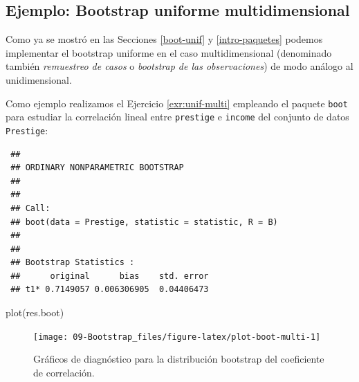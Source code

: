 \documentclass[
]{book}
\newenvironment{Shaded}{\begin{snugshade}}{\end{snugshade}}
\newcommand{\AttributeTok}[1]{\textcolor[rgb]{0.77,0.63,0.00}{#1}}
\newcommand{\ControlFlowTok}[1]{\textcolor[rgb]{0.13,0.29,0.53}{\textbf{#1}}}
\newcommand{\DecValTok}[1]{\textcolor[rgb]{0.00,0.00,0.81}{#1}}
\newcommand{\FunctionTok}[1]{\textcolor[rgb]{0.00,0.00,0.00}{#1}}
\newcommand{\NormalTok}[1]{#1}
\newcommand{\OtherTok}[1]{\textcolor[rgb]{0.56,0.35,0.01}{#1}}
\newcommand{\SpecialCharTok}[1]{\textcolor[rgb]{0.00,0.00,0.00}{#1}}
\theoremstyle{break}
\theoremstyle{nonumberplain}
\begin{document}
\hypertarget{boot-unif-multi}{%
\subsection{Ejemplo: Bootstrap uniforme multidimensional}\label{boot-unif-multi}}

Como ya se mostró en las Secciones \ref{boot-unif} y \ref{intro-paquetes} podemos implementar el bootstrap uniforme en el caso multidimensional (denominado también \emph{remuestreo de casos} o \emph{bootstrap de las observaciones}) de modo análogo al unidimensional.

Como ejemplo realizamos el Ejercicio \ref{exr:unif-multi} empleando el paquete \texttt{boot} para estudiar la correlación lineal entre \texttt{prestige} e \texttt{income} del conjunto de datos \texttt{Prestige}:

\begin{Shaded}
\end{Shaded}

\begin{verbatim}
 ## 
 ## ORDINARY NONPARAMETRIC BOOTSTRAP
 ## 
 ## 
 ## Call:
 ## boot(data = Prestige, statistic = statistic, R = B)
 ## 
 ## 
 ## Bootstrap Statistics :
 ##      original      bias    std. error
 ## t1* 0.7149057 0.006306905  0.04406473
\end{verbatim}

\begin{Shaded}
\begin{Highlighting}[]
\FunctionTok{plot}\NormalTok{(res.boot)}
\end{Highlighting}
\end{Shaded}

\begin{figure}[!htb]

{\centering \texttt{[image: 09-Bootstrap\_files/figure-latex/plot-boot-multi-1]} 

}

\caption{Gráficos de diagnóstico para la distribución bootstrap del coeficiente de correlación.}\label{fig:plot-boot-multi}
\end{figure}
\end{document}
